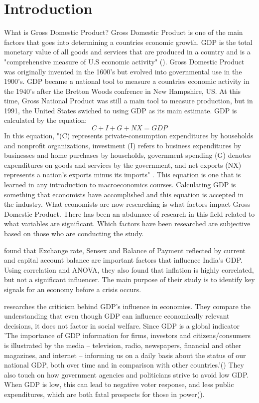 \documentclass[12pt]{article}
\begin{document}
\section*{Introduction}
What is Gross Domestic Product? Gross Domestic Product is one of the main factors that goes into determining a countries economic growth. 
GDP is the total monetary value of all goods and services that are produced in a country and is a "comprehensive measure of U.S economic activity" (\citet[]{bea}).
Gross Domestic Product was originally invented in the 1600's but evolved into governmental use in the 1900's. 
GDP became a national tool to measure a countries economic activity in the 1940's after the Bretton Woods confrence in New Hampshire, US.
At this time, Gross National Product was still a main tool to measure production, but in 1991, the United States swiched to using GDP as its main estimate. 
GDP is calculated by the equation: 
\begin{equation}
C + I + G + NX = GDP
\end{equation}
In this equation, "(C) represents private-consumption expenditures by households and nonprofit organizations, investment (I) refers to business expenditures by businesses and home purchases by households, 
government spending (G) denotes expenditures on goods and services by the government, and net exports (NX) represents a nation’s exports minus its imports" \citet[]{brit}.
This equation is one that is learned in any introduction to macroeconomics courses. 
Calculating GDP is something that economists have accomplished and this equation is accepted in the industry. 
What economists are now researching is what factors impact Gross Domestic Product. 
There has been an abdunace of research in this field related to what variables are significant. 
Which factors have been researched are subjective based on those who are conducting the study.

\citet{divya2014study} found that Exchange rate, Sensex and Balance of Payment reflected by current and capital account balance are important factors that influence India’s GDP. 
Using correlation and ANOVA, they also found that inflation is highly correlated, but not a significant influencer. 
The main purpose of their study is to identify key signals for an economy before a crisis occurs. 

\citet{van2009gdp} researches the criticism behind GDP's influence in economies. 
They compare the understanding that even though GDP can influence economically relevant decisions, it does not factor in social welfare.
Since GDP is a global indicator 'The importance of GDP information for firms, investors and citizens/consumers is illustrated by the media – television, radio, newspapers, financial and other magazines, and internet – informing us on a daily basis about the status of our national GDP, both over time and in comparison with other countries.'(\citet[]{van2009gdp})
They also touch on how government agencies and politicians strive to avoid low GDP. When GDP is low, this can lead to negative voter response, and less public expenditures, which are both fatal prospects for those in power(\citet[]{van2009gdp}).
\end{document}
